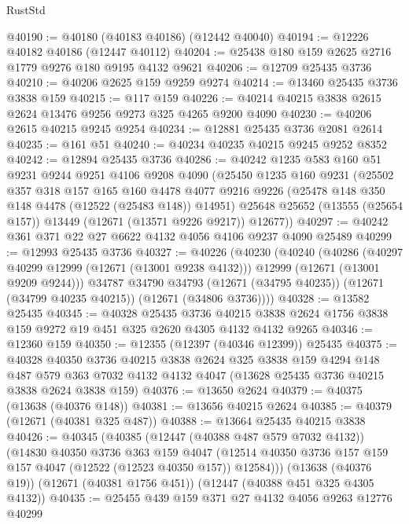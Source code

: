 \begin{lexlean}{RustStd}
\begin{coremodule}
@40190 := @40180 (@40183 @40186) (@12442 @40040)
@40194 := @12226 @40182 @40186 (@12447 @40112)
@40204 := @25438 @180 @159 @2625 @2716 @1779 @9276 @180 @9195 @4132 @9621
@40206 := @12709 @25435 @3736
@40210 := @40206 @2625 @159 @9259 @9274
@40214 := @13460 @25435 @3736 @3838 @159
@40215 := @117 @159
@40226 := @40214 @40215 @3838 @2615 @2624 @13476 @9256 @9273 @325 @4265 @9200 @4090
@40230 := @40206 @2615 @40215 @9245 @9254
@40234 := @12881 @25435 @3736 @2081 @2614
@40235 := @161 @51
@40240 := @40234 @40235 @40215 @9245 @9252 @8352
@40242 := @12894 @25435 @3736
@40286 := @40242
    @1235
    @583
    @160
    @51
    @9231
    @9244
    @9251
    @4106
    @9208
    @4090
    (@25450
      @1235
      @160
      @9231
      (@25502
        @357
        @318
        @157
        @165
        @160
        @4478
        @4077
        @9216
        @9226
        (@25478 @148 @350 @148 @4478 (@12522 (@25483 @148)) @14951)
        @25648
        @25652
        (@13555 (@25654 @157))
        @13449
        (@12671 (@13571 @9226 @9217))
        @12677))
@40297 := @40242 @361 @371 @22 @27 @6622 @4132 @4056 @4106 @9237 @4090 @25489
@40299 := @12993 @25435 @3736
@40327 := @40226
    (@40230
      (@40240
        (@40286
          (@40297 @40299 @12999 (@12671 (@13001 @9238 @4132)))
          @12999
          (@12671 (@13001 @9209 @9244)))
        @34787
        @34790
        @34793
        (@12671 (@34795 @40235))
        (@12671 (@34799 @40235 @40215))
        (@12671 (@34806 @3736))))
@40328 := @13582 @25435
@40345 := @40328
    @25435
    @3736
    @40215
    @3838
    @2624
    @1756
    @3838
    @159
    @9272
    @19
    @451
    @325
    @2620
    @4305
    @4132
    @4132
    @9265
@40346 := @12360 @159
@40350 := @12355 (@12397 (@40346 @12399)) @25435
@40375 := @40328
    @40350
    @3736
    @40215
    @3838
    @2624
    @325
    @3838
    @159
    @4294
    @148
    @487
    @579
    @363
    @7032
    @4132
    @4132
    @4047
    (@13628 @25435 @3736 @40215 @3838 @2624 @3838 @159)
@40376 := @13650 @2624
@40379 := @40375 (@13638 (@40376 @148))
@40381 := @13656 @40215 @2624
@40385 := @40379 (@12671 (@40381 @325 @487))
@40388 := @13664 @25435 @40215 @3838
@40426 := @40345
    (@40385
      (@12447 (@40388 @487 @579 @7032 @4132))
      (@14830
        @40350
        @3736
        @363
        @159
        @4047
        (@12514 @40350 @3736 @157 @159 @157 @4047 (@12522 (@12523 @40350 @157)) @12584)))
    (@13638 (@40376 @19))
    (@12671 (@40381 @1756 @451))
    (@12447 (@40388 @451 @325 @4305 @4132))
@40435 := @25455 @439 @159 @371 @27 @4132 @4056 @9263 @12776 @40299

\end{coremodule}
\end{lexlean}
